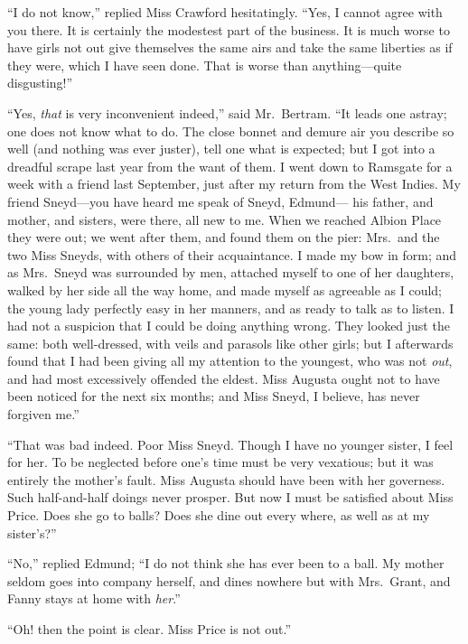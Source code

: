 \documentclass{article}
\begin{document}
``I do not know,'' replied Miss Crawford hesitatingly.
``Yes, I cannot agree with you there.  It is certainly
the modestest part of the business.  It is much worse to
have girls not out give themselves the same airs and take
the same liberties as if they were, which I have seen done.
That is worse than anything---quite disgusting!''

``Yes, \emph{that} is very inconvenient indeed,'' said Mr.\ Bertram.
``It leads one astray; one does not know what to do.
The close bonnet and demure air you describe so well (and
nothing was ever juster), tell one what is expected;
but I got into a dreadful scrape last year from the want
of them.  I went down to Ramsgate for a week with a friend
last September, just after my return from the West Indies.
My friend Sneyd---you have heard me speak of Sneyd, Edmund---%
his father, and mother, and sisters, were there, all new
to me.  When we reached Albion Place they were out;
we went after them, and found them on the pier:  Mrs.\ and
the two Miss Sneyds, with others of their acquaintance.
I made my bow in form; and as Mrs.\ Sneyd was surrounded
by men, attached myself to one of her daughters,
walked by her side all the way home, and made myself
as agreeable as I could; the young lady perfectly easy
in her manners, and as ready to talk as to listen.
I had not a suspicion that I could be doing anything wrong.
They looked just the same:  both well-dressed, with veils
and parasols like other girls; but I afterwards found
that I had been giving all my attention to the youngest,
who was not \emph{out}, and had most excessively offended
the eldest.  Miss Augusta ought not to have been noticed
for the next six months; and Miss Sneyd, I believe, has never
forgiven me.''

``That was bad indeed.  Poor Miss Sneyd.  Though I have no
younger sister, I feel for her.  To be neglected before
one's time must be very vexatious; but it was entirely
the mother's fault.  Miss Augusta should have been with
her governess.  Such half-and-half doings never prosper.
But now I must be satisfied about Miss Price.
Does she go to balls?  Does she dine out every where,
as well as at my sister's?''

``No,'' replied Edmund; ``I do not think she has ever been
to a ball.  My mother seldom goes into company herself,
and dines nowhere but with Mrs.\ Grant, and Fanny stays at
home with \emph{her}.''

``Oh! then the point is clear.  Miss Price is not out.''
\end{document}
